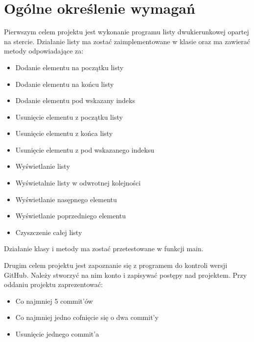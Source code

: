 	\newpage
\section{Ogólne określenie wymagań}		%













\hspace{0.60cm}Pierwszym celem projektu jest wykonanie programu listy dwukierunkowej opartej na stercie. Działanie listy ma zostać zaimplementowane w klasie oraz ma zawierać metody odpowiadające za:
\begin{itemize}
    \item Dodanie elementu na początku listy
    \item Dodanie elementu na końcu listy
    \item Dodanie elementu pod wskazany indeks
    \item Usunięcie elementu z początku listy
    \item Usunięcie elementu z końca listy
    \item Usunięcie elementu z pod wskazanego indeksu
    \item Wyświetlanie listy
    \item Wyświetalnie listy w odwrotnej kolejności
    \item Wyświetlanie nasępnego elementu
    \item Wyświetlanie poprzedniego elementu
    \item Czyszczenie całej listy
\end{itemize}
Działanie klasy i metody ma zostać przetestowane w funkcji main.

\hspace{0.60cm}Drugim celem projektu jest zapoznanie się z programem do kontroli wersji GitHub. Należy stworzyć na nim konto i zapisywać postępy nad projektem. Przy oddaniu projektu zaprezentować:
\begin{itemize}
    \item Co najmniej 5 commit'ów
    \item Co najmniej jedno cofnięcie się o dwa commit'y
    \item Usunięcie jednego commit'a
\end{itemize}